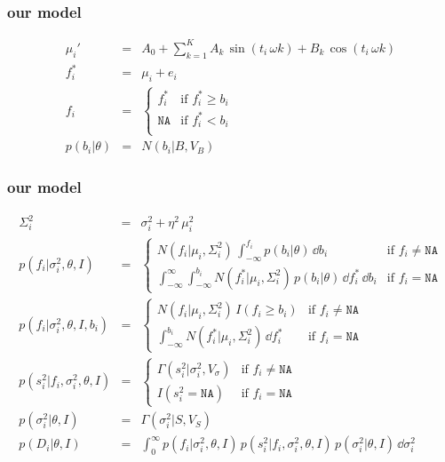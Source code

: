 \documentclass[pdftex]{beamer}
\newcommand{\fobs}{f_i}
\newcommand{\sobs}{s^2_i}
\newcommand{\ftrue}{f_i^*}
\begin{document}
\begin{frame}
  \frametitle{our model}
\begin{eqnarray}\displaystyle
\mu_i' &=& A_0 + \sum_{k=1}^K A_k\, \sin (t_i \, \omega  k) + B_k\, \cos (t_i \, \omega  k)
\nonumber \\
\ftrue &=& \mu_i + e_i
\nonumber \\
\fobs &=& \left\{\begin{array}{ll}
  \ftrue & \mbox{if $\ftrue \ge b_i$} \\
  \texttt{NA} & \mbox{if $\ftrue < b_i$} \\
\end{array} \right.
\nonumber \\
p(b_i|\theta) &=& N(b_i|B,V_B)
\nonumber
\end{eqnarray}
\end{frame}

\begin{frame}
  \frametitle{our model}
\begin{eqnarray}\displaystyle
\Sigma^2_i &=& \sigma^2_i + \eta^2\,\mu_i^2
\nonumber \\
p(\fobs |\sigma^2_i,\theta,I) &=& \left\{\begin{array}{ll}
  N(\fobs | \mu_i,  \Sigma^2_i)\,  \int_{-\infty}^{\fobs} p(b_i | \theta)\, \dd b_i & \mbox{if $\fobs \ne \texttt{NA}$} \\
  \int_{-\infty}^{\infty} \int_{-\infty}^{b_i} N(\ftrue | \mu_i, \Sigma^2_i)\, p(b_i | \theta)\, \dd \ftrue\, \dd b_i & \mbox{if $\fobs = \texttt{NA}$}
\end{array}\right.
\nonumber \\
p(\fobs |\sigma^2_i,\theta,I, b_i) &=& \left\{\begin{array}{ll}
  N(\fobs | \mu_i,  \Sigma^2_i)\,  I(\fobs \ge b_i) & \mbox{if $\fobs \ne \texttt{NA}$} \\
 \int_{-\infty}^{b_i} N(\ftrue | \mu_i, \Sigma^2_i)\, \dd \ftrue & \mbox{if $\fobs = \texttt{NA}$}
\end{array}\right.
\nonumber \\
p(\sobs | \fobs, \sigma^2_i, \theta,I) &=& \left\{\begin{array}{ll}
  \Gamma (\sobs | \sigma^2_i, V_{\sigma} ) & \mbox{if $\fobs \ne \texttt{NA}$} \\
 I(\sobs = \texttt{NA})& \mbox{if $\fobs = \texttt{NA}$}
\end{array}\right.
\nonumber \\
p(\sigma^2_i|\theta, I) &=& \Gamma(\sigma^2_i | S, V_S)
\nonumber \\
p(D_i|\theta,I) &=& \int_0^{\infty} p(\fobs |\sigma^2_i,\theta,I)\, p(\sobs | \fobs, \sigma^2_i,\theta,I)\, p(\sigma^2_i | \theta, I)\,\dd \sigma^2_i
\nonumber
\end{eqnarray}
\end{frame}
\end{document}

